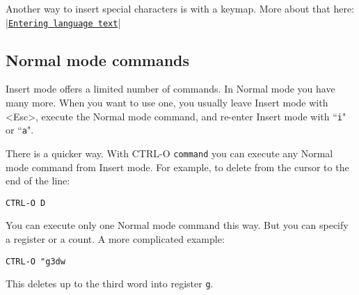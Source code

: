Another way to insert special characters is with a keymap.
More about that here: |\hyperref[Entering language text]{\texttt{Entering language text}}|
\subsection{Normal mode commands}
Insert mode offers a limited number of commands.
In Normal mode you have many more.
When you want to use one, you usually leave Insert mode with <Esc>, execute the Normal mode command, and re-enter Insert mode with ``\texttt{i}" or ``\texttt{a}".

There is a quicker way.
With CTRL-O \texttt{{command}} you can execute any Normal mode command from Insert mode.
For example, to delete from the cursor to the end of the line:

\begin{Verbatim}[samepage=true]
 CTRL-O D
\end{Verbatim}

You can execute only one Normal mode command this way.
But you can specify a register or a count.
A more complicated example:

\begin{Verbatim}[samepage=true]
 CTRL-O "g3dw
\end{Verbatim}

This deletes up to the third word into register \texttt{g}.
\clearpage
